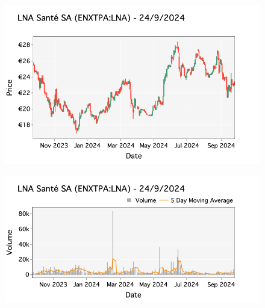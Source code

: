 \documentclass[a4paper, twocolumn, 11pt, paperequity]{gorgona}
\begin{document}
\begin{figure}[H]
    \centering
    \includegraphics[width=\columnwidth]{France/images/Top_Volume/Top_5_candlestick.png}
\end{figure}

\begin{figure}[H]
    \centering
    \includegraphics[width=\columnwidth]{France/images/Top_Volume/Top_5_volume.png}
\end{figure}
\end{document}
